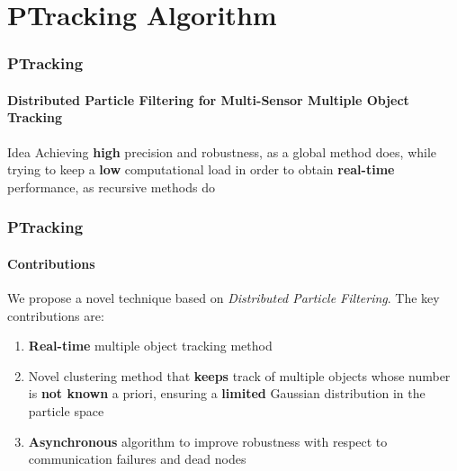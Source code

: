 \section{PTracking Algorithm}

\begin{frame}
	\frametitle{PTracking}
	\framesubtitle{Distributed Particle Filtering for Multi-Sensor Multiple Object Tracking}
	
	\LARGE
	
	\begin{block}{Idea}
		Achieving \textbf{high} precision and robustness, as a global method does, while trying to keep
		a \textbf{low} computational load in order to obtain \textbf{real-time} performance, as
		recursive methods do
	\end{block}
\end{frame}

\begin{frame}
	\frametitle{PTracking}
	\framesubtitle{Contributions}
	
	\Large
	
	\vspace{0.2cm}
	
	We propose a novel technique based on \emph{Distributed Particle Filtering}. The key contributions
	are:
	
	\vspace{0.15cm}
	
	\begin{enumerate}
		\item \textbf{Real-time} multiple object tracking method
		\item Novel clustering method that \textbf{keeps} track of multiple objects whose number is
			  \textbf{not known} a priori, ensuring a \textbf{limited} Gaussian distribution in the
			  particle space
		\item \textbf{Asynchronous} algorithm to improve robustness with respect to communication
			  failures and dead nodes
	\end{enumerate}
\end{frame}

